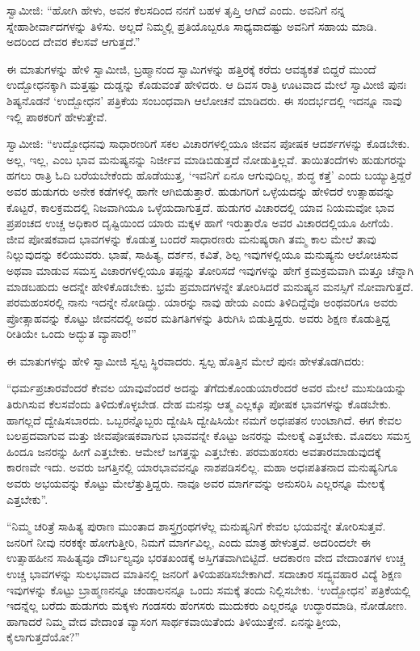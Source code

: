  ಸ್ವಾಮೀಜಿ: “ಹೋಗಿ ಹೇಳು, ಅವನ ಕೆಲಸದಿಂದ ನನಗೆ ಬಹಳ ತೃಪ್ತಿ ಆಗಿದೆ ಎಂದು. ಅವನಿಗೆ ನನ್ನ ಸ್ನೇಹಾಶೀರ್ವಾದಗಳನ್ನು ತಿಳಿಸು. ಅಲ್ಲದೆ ನಿಮ್ಮಲ್ಲಿ ಪ್ರತಿಯೊಬ್ಬರೂ ಸಾಧ್ಯವಾದಷ್ಟು ಅವನಿಗೆ ಸಹಾಯ ಮಾಡಿ. ಅದರಿಂದ ದೇವರ ಕೆಲಸವೆ ಆಗುತ್ತದೆ.” 

 ಈ ಮಾತುಗಳನ್ನು ಹೇಳಿ ಸ್ವಾಮೀಜಿ, ಬ್ರಹ್ಮಾನಂದ ಸ್ವಾಮಿಗಳನ್ನು ಹತ್ತಿರಕ್ಕೆ ಕರೆದು ಆವಶ್ಯಕತೆ ಬಿದ್ದರೆ ಮುಂದೆ ಉದ್ಬೋಧನಕ್ಕಾಗಿ ಮತ್ತಷ್ಟು ದುಡ್ಡನ್ನು ಕೊಡುವಂತೆ ಹೇಳಿದರು. ಆ ದಿವಸ ರಾತ್ರಿ ಊಟವಾದ ಮೇಲೆ ಸ್ವಾಮೀಜಿ ಪುನಃ ಶಿಷ್ಯನೊಡನೆ ‘ಉದ್ಬೋಧನ’ ಪತ್ರಿಕೆಯ ಸಂಬಂಧವಾಗಿ ಆಲೋಚನೆ ಮಾಡಿದರು. ಈ ಸಂದರ್ಭದಲ್ಲಿ ಇದನ್ನೂ ನಾವು ಇಲ್ಲಿ ಪಾಠಕರಿಗೆ ಹೇಳುತ್ತೇವೆ. 

 ಸ್ವಾಮೀಜಿ: “ಉದ್ಬೋಧನವು ಸಾಧಾರಣರಿಗೆ ಸಕಲ ವಿಚಾರಗಳಲ್ಲಿಯೂ ಜೀವನ ಪೋಷಕ ಆದರ್ಶಗಳನ್ನು ಕೊಡಬೇಕು. ಅಲ್ಲ, ಇಲ್ಲ, ಎಂಬ ಭಾವ ಮನುಷ್ಯನನ್ನು ನಿರ್ಜೀವ ಮಾಡಿಬಿಡುತ್ತದೆ ನೋಡುತ್ತಿಲ್ಲವೆ. ತಾಯಿತಂದೆಗಳು ಹುಡುಗರನ್ನು ಹಗಲು ರಾತ್ರಿ ಓದಿ ಬರೆಯಬೇಕೆಂದು ಹೊಡೆಯುತ್ತ, ‘ಇವನಿಗೆ ಏನೂ ಆಗುವುದಿಲ್ಲ, ಶುದ್ಧ ಕತ್ತೆ’ ಎಂದು ಬಯ್ಯುತ್ತಿದ್ದರೆ ಅವರ ಹುಡುಗರು ಅನೇಕ ಕಡೆಗಳಲ್ಲಿ ಹಾಗೇ ಆಗಿಬಿಡುತ್ತಾರೆ. ಹುಡುಗರಿಗೆ ಒಳ್ಳೆಯದನ್ನು ಹೇಳಿದರೆ ಉತ್ಸಾಹವನ್ನು ಕೊಟ್ಟರೆ, ಕಾಲಕ್ರಮದಲ್ಲಿ ನಿಜವಾಗಿಯೂ ಒಳ್ಳೆಯದಾಗುತ್ತದೆ. ಹುಡುಗರ ವಿಚಾರದಲ್ಲಿ ಯಾವ ನಿಯಮವೋ ಭಾವ ಪ್ರಪಂಚದ ಉಚ್ಚ ಅಧಿಕಾರ ದೃಷ್ಟಿಯಿಂದ ಯಾರು ಮಕ್ಕಳ ಹಾಗೆ ಇರುತ್ತಾರೊ ಅವರ ವಿಚಾರದಲ್ಲಿಯೂ ಹೀಗೆಯೆ. ಜೀವ ಪೋಷಕವಾದ ಭಾವಗಳನ್ನು ಕೊಡುತ್ತ ಬಂದರೆ ಸಾಧಾರಣರು ಮನುಷ್ಯರಾಗಿ ತಮ್ಮ ಕಾಲ ಮೇಲೆ ತಾವು ನಿಲ್ಲುವುದನ್ನು ಕಲಿಯುವರು. ಭಾಷೆ, ಸಾಹಿತ್ಯ, ದರ್ಶನ, ಕವಿತೆ, ಶಿಲ್ಪ ಇವುಗಳಲ್ಲಿಯೂ ಮನುಷ್ಯನು ಆಲೋಚಿಸುವ ಅಥವಾ ಮಾಡುವ ಸಮಸ್ತ ವಿಚಾರಗಳಲ್ಲಿಯೂ ತಪ್ಪನ್ನು ತೋರಿಸದೆ ಇವುಗಳನ್ನು ಹೇಗೆ ಕ್ರಮಕ್ರಮವಾಗಿ ಮತ್ತೂ ಚೆನ್ನಾಗಿ ಮಾಡಬಹುದು ಅದನ್ನೇ ಹೇಳಿಕೊಡಬೇಕು. ಭ್ರಮೆ ಪ್ರಮಾದಗಳನ್ನೇ ತೋರಿಸಿದರೆ ಮನುಷ್ಯನ ಮನಸ್ಸಿಗೆ ನೋವಾಗುತ್ತದೆ. ಪರಮಹಂಸರಲ್ಲಿ ನಾನು ಇದನ್ನೇ ನೋಡಿದ್ದು. ಯಾರನ್ನು ನಾವು ಹೇಯ ಎಂದು ತಿಳಿದಿದ್ದೆವೊ ಅಂಥವರಿಗೂ ಅವರು ಪ್ರೋತ್ಸಾಹವನ್ನು ಕೊಟ್ಟು ಜೀವನದಲ್ಲಿ ಅವರ ಮತಿಗತಿಗಳನ್ನು ತಿರುಗಿಸಿ ಬಿಡುತ್ತಿದ್ದರು. ಅವರು ಶಿಕ್ಷಣ ಕೊಡುತ್ತಿದ್ದ ರೀತಿಯೇ ಒಂದು ಅದ್ಭುತ ವ್ಯಾಪಾರ!” 

 ಈ ಮಾತುಗಳನ್ನು ಹೇಳಿ ಸ್ವಾಮೀಜಿ ಸ್ವಲ್ಪ ಸ್ಥಿರವಾದರು. ಸ್ವಲ್ಪ ಹೊತ್ತಿನ ಮೇಲೆ ಪುನಃ ಹೇಳತೊಡಗಿದರು: 

\newpage

 “ಧರ್ಮಪ್ರಚಾರವೆಂದರೆ ಕೇವಲ ಯಾವುವೆಂದರೆ ಅದನ್ನು ತೆಗೆದುಕೊಂಡು\break ಯಾರೆಂದರೆ ಅವರ ಮೇಲೆ ಮುಸುಡಿಯನ್ನು ತಿರುಗಿಸುವ ಕೆಲಸವೆಂದು ತಿಳಿದುಕೊಳ್ಳಬೇಡ. ದೇಹ ಮನಸ್ಸು ಆತ್ಮ ಎಲ್ಲಕ್ಕೂ ಪೋಷಕ ಭಾವಗಳನ್ನು ಕೊಡಬೇಕು. ಹಾಗಲ್ಲದೆ ದ್ವೇಷಿಸಬಾರದು. ಒಬ್ಬರನ್ನೊಬ್ಬರು ದ್ವೇಷಿಸಿ ದ್ವೇಷಿಸಿಯೇ ನಮಗೆ ಅಧಃಪತನ ಉಂಟಾಗಿದೆ. ಈಗ ಕೇವಲ ಬಲಪ್ರದವಾಗುವ ಮತ್ತು ಜೀವಪೋಷಕವಾಗುವ ಭಾವವನ್ನೇ ಕೊಟ್ಟು ಜನರನ್ನು ಮೇಲಕ್ಕೆ ಎತ್ತಬೇಕು. ಮೊದಲು ಸಮಸ್ತ ಹಿಂದೂ ಜನರನ್ನು ಹೀಗೆ ಎತ್ತಬೇಕು. ಆಮೇಲೆ ಜಗತ್ತನ್ನು ಎತ್ತಬೇಕು. ಪರಮಹಂಸರು ಅವತಾರಮಾಡುವುದಕ್ಕೆ ಕಾರಣವೇ ಇದು. ಅವರು ಜಗತ್ತಿನಲ್ಲಿ ಯಾರಭಾವವನ್ನೂ ನಾಶಪಡಿಸಲಿಲ್ಲ. ಮಹಾ ಅಧಃಪತಿತನಾದ ಮನುಷ್ಯನಿಗೂ ಅವರು ಅಭಯವನ್ನು ಕೊಟ್ಟು ಮೇಲೆತ್ತುತ್ತಿದ್ದರು. ನಾವೂ ಅವರ ಮಾರ್ಗವನ್ನು ಅನುಸರಿಸಿ ಎಲ್ಲರನ್ನೂ ಮೇಲಕ್ಕೆ ಎತ್ತಬೇಕು”. 

 “ನಿಮ್ಮ ಚರಿತ್ರೆ ಸಾಹಿತ್ಯ ಪುರಾಣ ಮುಂತಾದ ಶಾಸ್ತ್ರಗ್ರಂಥಗಳೆಲ್ಲ ಮನುಷ್ಯನಿಗೆ ಕೇವಲ ಭಯವನ್ನೇ ತೋರಿಸುತ್ತವೆ. ಜನರಿಗೆ ನೀವು ನರಕಕ್ಕೇ ಹೋಗುತ್ತೀರಿ, ನಿಮಗೆ ಮಾರ್ಗವಿಲ್ಲ, ಎಂದು ಮಾತ್ರ ಹೇಳುತ್ತವೆ. ಅದರಿಂದಲೇ ಈ ಉತ್ಸಾಹಹೀನ ಸಾಹಿತ್ಯವೂ ದೌರ್ಬಲ್ಯವೂ ಭರತಖಂಡಕ್ಕೆ ಅಸ್ತಿಗತವಾಗಿಬಿಟ್ಟಿದೆ. ಆದಕಾರಣ ವೇದ ವೇದಾಂತಗಳ ಉಚ್ಚ ಉಚ್ಚ ಭಾವಗಳನ್ನು ಸುಲಭವಾದ ಮಾತಿನಲ್ಲಿ ಜನರಿಗೆ ತಿಳಿಯಪಡಿಸಬೇಕಾಗಿದೆ. ಸದಾಚಾರ ಸದ್ವ್ಯವಹಾರ ವಿದ್ಯೆ ಶಿಕ್ಷಣ ಇವುಗಳನ್ನು ಕೊಟ್ಟು ಬ್ರಾಹ್ಮಣನನ್ನೂ ಚಂಡಾಲನನ್ನೂ ಒಂದು ಸಮಕ್ಕೆ ತಂದು ನಿಲ್ಲಿಸಬೇಕು. ‘ಉದ್ಬೋಧನ' ಪತ್ರಿಕೆಯಲ್ಲಿ ಇದನ್ನೆಲ್ಲ ಬರೆದು ಹುಡುಗರು ಮಕ್ಕಳು ಗಂಡಸರು ಹೆಂಗಸರು ಮುದುಕರು ಎಲ್ಲರನ್ನೂ ಉದ್ಧಾರಮಾಡಿ, ನೋಡೋಣ. ಹಾಗಾದರೆ ನಿಮ್ಮ ವೇದ ವೇದಾಂತ ವ್ಯಾಸಂಗ ಸಾರ್ಥಕವಾಯಿತೆಂದು ತಿಳಿಯುತ್ತೇನೆ. ಏನನ್ನುತ್ತೀಯ, ಕೈಲಾಗುತ್ತದೆಯೋ?” 

